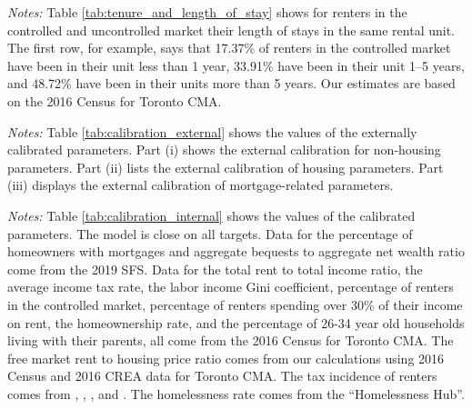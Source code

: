 \documentclass[parskip=full]{article}
\newenvironment{fignote2}[1]
{
\par
\medskip
\begin{minipage}{#1}
\footnotesize
}
{
\end{minipage}
}
\begin{document}
\begin{table}[H]
    \centering
    \caption{Rental market and length of stay in the same unit}
    \vspace{-0.75cm}
    \label{tab:tenure_and_length_of_stay}
    
    \vspace{-0.5cm}
    \begin{fignote2}{0.56\textwidth}
    \textit{Notes:} Table \ref{tab:tenure_and_length_of_stay} shows for renters in the controlled and uncontrolled market their length of stays in the same rental unit. The first row, for example, says that 17.37\% of renters in the controlled market have been in their unit less than 1 year, 33.91\% have been in their unit 1–5 years, and 48.72\% have been in their units more than 5 years. Our estimates are based on the 2016 Census for Toronto CMA.
    \end{fignote2}
\end{table}
    
\begin{table}[H]
    \centering
    \caption{Externally assigned parameter values}
    \vspace{-1.25cm}
    \label{tab:calibration_external}
    
    \vspace{-0.5cm}
    \begin{fignote2}{1.11\textwidth}
    \textit{Notes:} Table \ref{tab:calibration_external} shows the values of the externally calibrated parameters. Part (i) shows the external calibration for non-housing parameters. Part (ii) lists the external calibration of housing parameters. Part (iii) displays the external calibration of mortgage-related parameters.
    \end{fignote2}
\end{table}

\begin{table}[H]
    \centering
    \caption{Internally assigned parameter values}
    \vspace{-1.25cm}
    \label{tab:calibration_internal}
    
    \vspace{-0.5cm}
    \begin{fignote2}{1.08\textwidth}
    \textit{Notes:} Table \ref{tab:calibration_internal} shows the values of the calibrated parameters. The model is close on all targets. Data for the percentage of homeowners with mortgages and aggregate bequests to aggregate net wealth ratio come from the 2019 SFS. Data for the total rent to total income ratio, the average income tax rate, the labor income Gini coefficient, percentage of renters in the controlled market, percentage of renters spending over 30\% of their income on rent, the homeownership rate, and the percentage of 26-34 year old households living with their parents, all come from the 2016 Census for Toronto CMA. The free market rent to housing price ratio comes from our calculations using 2016 Census and 2016 CREA data for Toronto CMA. The tax incidence of renters comes from \citet{cy-1994}, \citet{susin-2002}, \citet{fack-2006}, and \citet{sy-2020}. The homelessness rate comes from the ``Homelessness Hub''.
    \end{fignote2}
\end{table}
\end{document}
